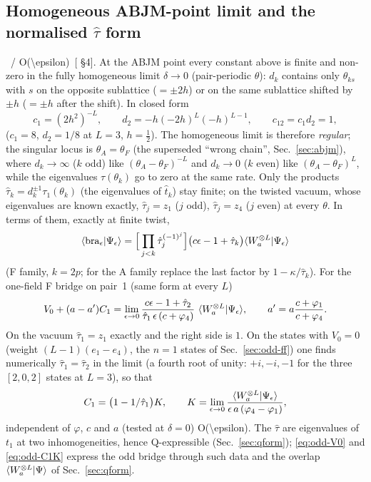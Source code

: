 \subsection{Homogeneous ABJM-point limit and the normalised $\hat\tau$ form}\label{sec:odd-hom}

\ex\ / \num{O(\epsilon)}\ [ \S4]. At the ABJM point every constant above is finite and non-zero in the fully
homogeneous limit $\delta\to0$ (pair-periodic $\theta$): $d_k$ contains only $\theta_{ks}$ with $s$ on the opposite sublattice ($=\pm2h$) or on the same
sublattice shifted by $\pm h$ ($=\pm h$ after the shift). In closed form
\begin{equation}
 c_1=(2h^2)^{-L},\qquad d_2=-h(-2h)^L(-h)^{L-1},\qquad c_{12}=c_1d_2=1 ,
\end{equation}
($c_1=8$, $d_2=1/8$ at $L=3$, $h=\tfrac12$). The homogeneous limit is therefore \emph{regular}; the singular locus is $\theta_A=\theta_F$ (the superseded
``wrong chain'', Sec.~\ref{sec:abjm}), where $d_k\to\infty$ ($k$ odd) like $(\theta_A-\theta_F)^{-L}$ and $d_k\to0$ ($k$ even) like $(\theta_A-\theta_F)^{L}$, while the eigenvalues
$\tau(\theta_k)$ go to zero at the same rate. Only the products $\hat\tau_k=d_k^{\pm1}\tau_1(\theta_k)$ (the eigenvalues of $\hat t_k$) stay finite; on the
twisted vacuum, whose eigenvalues are known exactly, $\hat\tau_j=z_1$ ($j$ odd), $\hat\tau_j=z_4$ ($j$ even) at every $\theta$. In terms of them, exactly at finite twist,
\begin{equation}\label{eq:odd-tauhat}
 \langle\mathrm{bra}_\epsilon|\Psi_\epsilon\rangle=\Big[\prod_{j<k}\hat\tau_j^{(-1)^j}\Big]\big(c\epsilon-1+\hat\tau_k\big)\langle W_a^{\otimes L}|\Psi_\epsilon\rangle
\end{equation}
(F family, $k=2p$; for the A family replace the last factor by $1-\kappa/\hat\tau_k$). For the one-field F bridge on pair~1 (same form at every $L$)
\begin{equation}\label{eq:odd-V0}
 V_0+(a-a')C_1=\lim_{\epsilon\to0}\frac{c\epsilon-1+\hat\tau_2}{\hat\tau_1\,\epsilon\,(c+\varphi_4)}\ \braket{W_a^{\otimes L}}{\Psi_\epsilon},\qquad a'=a\frac{c+\varphi_1}{c+\varphi_4}.
\end{equation}
On the vacuum $\hat\tau_1=z_1$ exactly and the right side is $1$. On the states with $V_0=0$ (weight $(L-1)(e_1-e_4)$, the $n=1$ states of
Sec.~\ref{sec:odd-ff}) one finds numerically $\hat\tau_1=\hat\tau_2$ in the limit (a fourth root of unity: $+i,-i,-1$ for the three $[2,0,2]$
states at $L=3$), so that
\begin{equation}\label{eq:odd-C1K}
 C_1=\big(1-1/\hat\tau_1\big)K,\qquad K=\lim_{\epsilon\to0}\frac{\langle W_a^{\otimes L}|\Psi_\epsilon\rangle}{\epsilon\,a\,(\varphi_4-\varphi_1)},
\end{equation}
independent of $\varphi$, $c$ and $a$ (tested at $\delta=0$) \num{O(\epsilon)}. The $\hat\tau$ are eigenvalues of $t_1$ at two inhomogeneities, hence
Q-expressible (Sec.~\ref{sec:qform}); \eqref{eq:odd-V0} and \eqref{eq:odd-C1K} express the odd bridge through such data and the overlap
$\langle W_a^{\otimes L}|\Psi\rangle$ of Sec.~\ref{sec:qform}.


